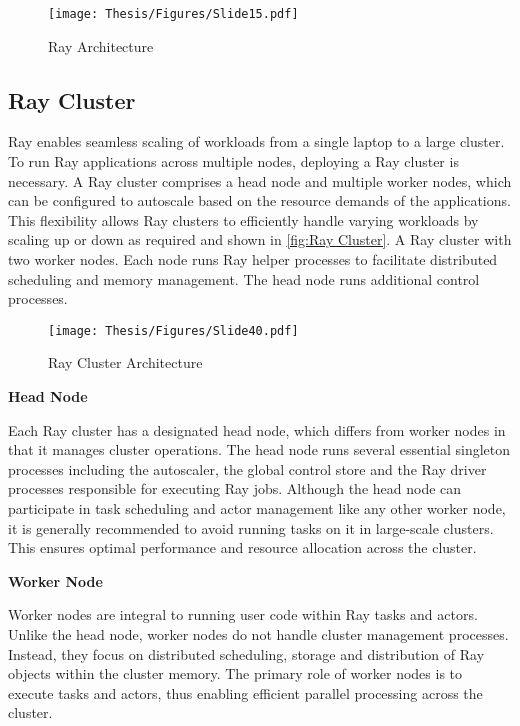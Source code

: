 \captionsetup{justification=centering}
\begin{figure}[h]
\centering
\texttt{[image: Thesis/Figures/Slide15.pdf]}
\caption{\label{fig:Ray Architecture}Ray Architecture \cite{r34}}
\end{figure}


\subsection{Ray Cluster}

Ray enables seamless scaling of workloads from a single laptop to a large cluster. To run Ray applications across multiple nodes, deploying a Ray cluster is necessary. A Ray cluster comprises a head node and multiple worker nodes, which can be configured to autoscale based on the resource demands of the applications. This flexibility allows Ray clusters to efficiently handle varying workloads by scaling up or down as required and shown in \autoref{fig:Ray Cluster}.
A Ray cluster with two worker nodes. Each node runs Ray helper processes to facilitate distributed scheduling and memory management. The head node runs additional control processes. \cite{ray_doc}


\captionsetup{justification=centering}
\begin{figure}[h]
\centering
\texttt{[image: Thesis/Figures/Slide40.pdf]}
\caption{\label{fig:Ray Cluster}Ray Cluster Architecture \cite{ray_doc}}
\end{figure}

\textbf{Head Node}

Each Ray cluster has a designated head node, which differs from worker nodes in that it manages cluster operations. The head node runs several essential singleton processes including the autoscaler, the global control store and the Ray driver processes responsible for executing Ray jobs. Although the head node can participate in task scheduling and actor management like any other worker node, it is generally recommended to avoid running tasks on it in large-scale clusters. This ensures optimal performance and resource allocation across the cluster. \cite{ray_doc}

\textbf{Worker Node}

Worker nodes are integral to running user code within Ray tasks and actors. Unlike the head node, worker nodes do not handle cluster management processes. Instead, they focus on distributed scheduling, storage and distribution of Ray objects within the cluster memory. The primary role of worker nodes is to execute tasks and actors, thus enabling efficient parallel processing across the cluster. \cite{ray_doc}

